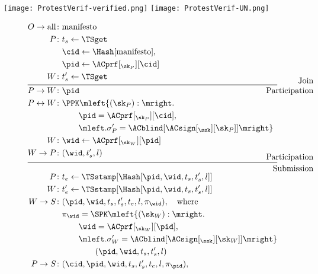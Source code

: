 \begin{frame}
  \centering
  \texttt{[image: ProtestVerif-verified.png]}
  \texttt{[image: ProtestVerif-UN.png]}
\end{frame}


\begin{figure}
  \centering
  \begin{minipage}{\linewidth}
    \begin{align*}
      O\to \text{all}\colon & \text{manifesto} \\
      P\colon & t_s\gets \TSget \\
        & \cid\gets \Hash[\text{manifesto}], \\
        & \pid\gets \ACprf[_{\sk_P}][\cid] \\
      W\colon & t_s'\gets \TSget
      \\[-1em]
      \noalign{\hfill Join}
      \midrule
      \noalign{\hfill Participation}
      \\[-3em]
      P\to W\colon & \pid \\
      P\leftrightarrow W\colon &
        \PPK\mleft\{ (\sk_P) : \mright. \\
        & \qquad \pid = \ACprf[_{\sk_P}][\cid], \\
        & \qquad \mleft. \sigma_P' = \ACblind[\ACsign[_{\ssk}][\sk_P]] \mright\} 
        \\
      W\colon & \wid\gets \ACprf[_{\sk_W}][\pid] \\
      W\to P\colon & (\wid, t_s', l)
      \\[-1em]
      \noalign{\hfill Participation}
      \midrule
      \noalign{\hfill Submission}
      \\[-2em]
      P\colon & t_e\gets \TSstamp[\Hash[\pid, \wid, t_s, t_s', l]] \\
      W\colon & t_e'\gets \TSstamp[\Hash[\pid, \wid, t_s, t_s', l]] \\
      W\to S\colon & (\pid, \wid, t_s, t_s', t_e, l, \pi_{\wid}),\quad 
      \text{where} \\
        & \pi_{\wid} = \SPK\mleft\{ (\sk_W) : \mright. \\
        & \qquad \wid = \ACprf[_{\sk_W}][\pid], \\
        & \qquad \mleft. \sigma_W' = \ACblind[\ACsign[_{\ssk}][\sk_W]]\mright\} 
        \\
        & \qquad\qquad (\pid, \wid, t_s, t_s', l) \\
      P\to S\colon & (\cid, \pid, \wid, t_s, t_s', t_e, l, \pi_{\pid}),\quad 

\end{align*}
\end{minipage}
\end{figure}
